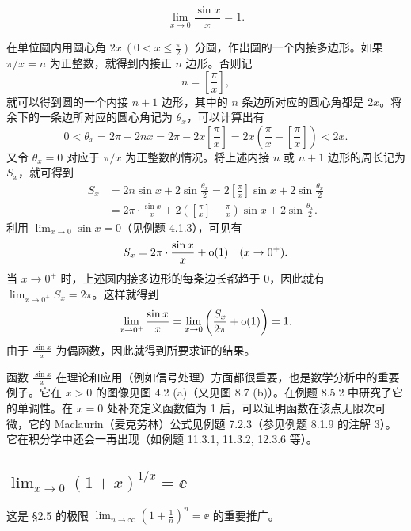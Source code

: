 \begin{xproposition}[4.3.1（第一个重要极限）]
\[
  \lim_{x\to0}\frac{\sin x}{x}=1.
\]
\end{xproposition}
\begin{xproof}
在单位圆内用圆心角 $2x\ (0<x\leq\frac\pi2)$ 分圆，作出圆的一个内接多边形。如果 $\pi/x=n$ 为正整数，就得到内接正 $n$ 边形。否则记
\[
  n=\left[\frac\pi x\right],
\]
就可以得到圆的一个内接 $n+1$ 边形，其中的 $n$ 条边所对应的圆心角都是 $2x$。将余下的一条边所对应的圆心角记为 $\theta_x$，可以计算出有
\[
  0<\theta_x=2\pi-2nx=2\pi-2x\left[\frac\pi x\right]
  =2x\left(\frac\pi x-\left[\frac\pi x\right]\right)<2x.
\]
又令 $\theta_x=0$ 对应于 $\pi/x$ 为正整数的情况。将上述内接 $n$ 或 $n+1$ 边形的周长记为 $S_x$，就可得到
\begin{align*}
  S_x&=2n\sin x+2\sin\frac{\theta_x}2
  =2\left[\frac\pi x\right]\sin x+2\sin\frac{\theta_x}2\\
  &=2\pi\cdot\frac{\sin x}{x}
  +2\left(\left[\frac\pi x\right]-\frac\pi x\right)\sin x
  +2\sin\frac{\theta_x}2.
\end{align*}
利用 $\lim_{x\to0}\sin x=0$（见例题 4.1.3），可见有
\[
  S_x=2\pi\cdot\frac{\sin x}{x}+\mathrm{o}(1)\quad(x\to0^+).
\]
当 $x\to0^+$ 时，上述圆内接多边形的每条边长都趋于 0，因此就有 $\lim_{x\to0^+}S_x=2\pi$。这样就得到
\[
  \lim_{x\to0^+}\frac{\sin x}{x}
  =\lim_{x\to0}\left(\frac{S_x}{2\pi}+\mathrm{o}(1)\right)=1.
\]
由于 $\frac{\sin x}{x}$ 为偶函数，因此就得到所要求证的结果。
\end{xproof}

\begin{xremark}
函数 $\frac{\sin x}{x}$ 在理论和应用（例如信号处理）方面都很重要，也是数学分析中的重要例子。它在 $x>0$ 的图像见图 4.2 (a)（又见图 8.7 (b)）。在例题 8.5.2 中研究了它的单调性。在 $x=0$ 处补充定义函数值为 1 后，可以证明函数在该点无限次可微，它的 Maclaurin（麦克劳林）公式见例题 7.2.3（参见例题 8.1.9 的注解 3）。它在积分学中还会一再出现（如例题 11.3.1, 11.3.2, 12.3.6 等）。
\end{xremark}

\subsection{\texorpdfstring{$\displaystyle\lim_{x\to0}(1+x)^{1/x}=\ee$}{极限 (1+x) 的 1/x 次幂 = e}}

这是 §2.5 的极限 $\lim_{n\to\infty}(1+\frac1n)^n=\ee$ 的重要推广。

